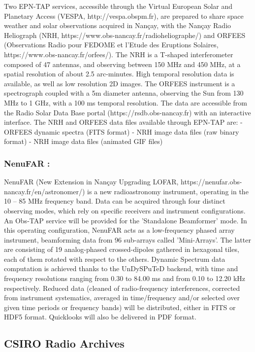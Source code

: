 \documentclass[11pt,a4paper]{ivoa}
\begin{document}
\begin{\itemize}
Two EPN-TAP services, accessible through the Virtual European Solar and Planetary Access (VESPA, http://vespa.obspm.fr), are prepared to share space weather and solar observations acquired in Nançay, with the Nançay Radio Heliograph (NRH, https://www.obs-nancay.fr/radioheliographe/) and ORFEES (Observations Radio pour FEDOME et l'Etude des Eruptions Solaires, https://www.obs-nancay.fr/orfees/). The NRH is a T-shaped interferometer composed of 47 antennas, and observing between 150 MHz and 450 MHz, at a spatial resolution of about 2.5 arc-minutes. High temporal resolution data is available, as well as low resolution 2D images. The ORFEES instrument is a spectrograph coupled with a 5m diameter antenna, observing the Sun from 130 MHz to 1 GHz, with a 100 ms temporal resolution. The data are accessible from the Radio Solar Data Base portal (https://rsdb.obs-nancay.fr) with an interactive interface. The NRH and ORFEES data files available through EPN-TAP are:
- ORFEES dynamic spectra (FITS format)
- NRH image data files (raw binary format)
- NRH image data files (animated GIF files)


\subsubsection{NenuFAR :}

NenuFAR (New Extension in Nançay Upgrading LOFAR, https://nenufar.obs-nancay.fr/en/astronomer/) is a new radioastronomy instrument, operating in the 10 – 85 MHz frequency band. Data can be acquired through four distinct observing modes, which rely on specific receivers and instrument configurations. An Obs-TAP service will be provided for the 'Standalone Beamformer' mode. In this operating configuration, NenuFAR acts as a low-frequency phased array instrument, beamforming data from 96 sub-arrays called 'Mini-Arrays'. The latter are consisting of 19 analog-phased crossed-dipoles gathered in hexagonal tiles, each of them rotated with respect to the others. Dynamic Spectrum data computation is achieved thanks to the UnDySPuTeD backend, with time and frequency resolutions ranging from 0.30 to 84.00 ms and from 0.10 to 12.20 kHz respectively. Reduced data (cleaned of radio-frequency interferences, corrected from instrument systematics, averaged in time/frequency and/or selected over given time periods or frequency bands) will be distributed, either in FITS or HDF5 format. Quicklooks will also be delivered in PDF format.

\subsection{CSIRO Radio Archives}\label{sec:CASDA}


\end{\itemize}
\end{document}
